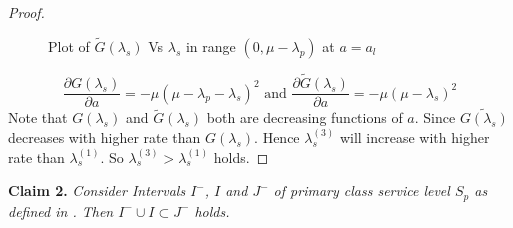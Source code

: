\documentclass[12pt, a4paper]{report}
\begin{document}
\begin{proof}
\begin{figure}[ht]
\hspace{0.5cm}
\begin{minipage}[b]{0.5\linewidth}
\centering

 \caption{ Plot of $\tilde{G}(\lambda_s)$ Vs $\lambda_s$ in range $(0, \mu-\lambda_p)$ at $a=a_l$ }\label{fig:Gtildals}
\end{minipage}
\end{figure}
$$\dfrac{\partial G(\lambda_s)}{\partial a} = -\mu(\mu-\lambda_p - \lambda_s)^2 \text{ and }\dfrac{\partial \tilde{G}(\lambda_s)}{\partial a} =  -\mu(\mu-\lambda_s)^2$$
Note that $G(\lambda_s)$ and $\tilde{G}(\lambda_s)$ both are decreasing functions of $a$. Since $\tilde{G(\lambda_s)}$ decreases with higher rate than $G(\lambda_s)$. Hence $\lambda_s^{(3)}$ will increase with higher rate than $\lambda_s^{(1)}$. So $\lambda_s^{(3)}>\lambda_s^{(1)}$ holds.
\end{proof}
\textbf{Claim 2.} \textit{Consider Intervals $I^-$, $I$ and $J^-$ of primary class service level $S_p$ as defined in \cite{Sudhir_standard_style}. Then $I^- \cup I \subset J^-$ holds.}
\end{document}
